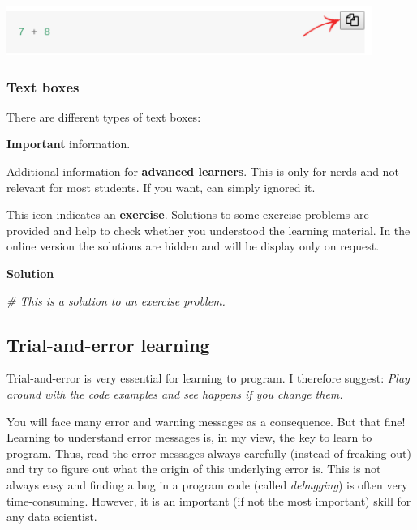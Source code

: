 \documentclass[
]{scrartcl}
\makeatletter
\newenvironment{Shaded}{\begin{snugshade}}{\end{snugshade}}
\newcommand{\CommentTok}[1]{\textcolor[rgb]{0.56,0.35,0.01}{\textit{#1}}}
\newenvironment{kframe}{%
\medskip{}
\setlength{\fboxsep}{.8em}
 \def\at@end@of@kframe{}%
 \ifinner\ifhmode%
  \def\at@end@of@kframe{\end{minipage}}%
  \begin{minipage}{\columnwidth}%
 \fi\fi%
 \def\FrameCommand##1{\hskip\@totalleftmargin \hskip-\fboxsep
 \colorbox{shadecolor}{##1}\hskip-\fboxsep
     \hskip-\linewidth \hskip-\@totalleftmargin \hskip\columnwidth}%
 \MakeFramed {\advance\hsize-\width
   \@totalleftmargin\z@ \linewidth\hsize
   \@setminipage}}%
 {\par\unskip\endMakeFramed%
 \at@end@of@kframe}
\newenvironment{rmdblock}[1]
  {
  \begin{itemize}
  \renewcommand{\labelitemi}{
    \raisebox{-.7\height}[0pt][0pt]{
      {\setkeys{Gin}{width=3em,keepaspectratio}\texttt{[image: images/\#1]}}
    }
  }
  \setlength{\fboxsep}{1em}
  \begin{kframe}
  \item
  }
  {
  \end{kframe}
  \end{itemize}
  }
\newenvironment{geek}
    {\begin{rmdblock}{geek}}
    {\end{rmdblock}}
\newenvironment{important}
    {\begin{rmdblock}{hint}}
    {\end{rmdblock}}
\newenvironment{myexercise}
    {\begin{rmdblock}{exercise_green}}
    {\end{rmdblock}}
\newenvironment{webexsolution}[1]
    {\par\tiny\textbf{#1}}
    {\par}
\newcommand{\webexhide}[1]{\begin{webexsolution}{#1}}
\newcommand{\webexunhide}{\end{webexsolution}}
\makeatother
\begin{document}
\begin{center}\includegraphics[width=450px]{images/click_copy_code} \end{center}

\hypertarget{text-boxes}{%
\subsubsection{Text boxes}\label{text-boxes}}

There are different types of text boxes:

\begin{important}
\textbf{Important} information.
\end{important}

\begin{geek}
Additional information for \textbf{advanced learners}. This is only for
nerds and not relevant for most students. If you want, can simply
ignored it.
\end{geek}

\begin{myexercise}
This icon indicates an \textbf{exercise}. Solutions to some exercise
problems are provided and help to check whether you understood the
learning material. In the online version the solutions are hidden and
will be display only on request.
\end{myexercise}
\webexhide{Solution}

\begin{Shaded}
\begin{Highlighting}[]
\CommentTok{\# This is a solution to an exercise problem.}
\end{Highlighting}
\end{Shaded}

\webexunhide

\hypertarget{trial-and-error-learning}{%
\subsection{Trial-and-error learning}\label{trial-and-error-learning}}

Trial-and-error is very essential for learning to program. I therefore suggest: \emph{Play around with the code examples and see happens if you change them.}

You will face many error and warning messages as a consequence. But that fine! Learning to understand error messages is, in my view, the key to learn to program. Thus, read the error messages always carefully (instead of freaking out) and try to figure out what the origin of this underlying error is. This is not always easy and finding a bug in a program code (called \emph{debugging}) is often very time-consuming. However, it is an important (if not the most important) skill for any data scientist.
\end{document}
